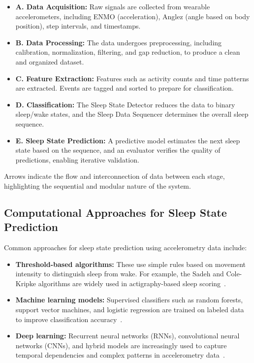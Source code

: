 \documentclass[conference]{IEEEtran}
\begin{document}
\begin{itemize}
    \item \textbf{A. Data Acquisition:} Raw signals are collected from wearable accelerometers, including ENMO (acceleration), Anglez (angle based on body position), step intervals, and timestamps.
    \item \textbf{B. Data Processing:} The data undergoes preprocessing, including calibration, normalization, filtering, and gap reduction, to produce a clean and organized dataset.
    \item \textbf{C. Feature Extraction:} Features such as activity counts and time patterns are extracted. Events are tagged and sorted to prepare for classification.
    \item \textbf{D. Classification:} The Sleep State Detector reduces the data to binary sleep/wake states, and the Sleep Data Sequencer determines the overall sleep sequence.
    \item \textbf{E. Sleep State Prediction:} A predictive model estimates the next sleep state based on the sequence, and an evaluator verifies the quality of predictions, enabling iterative validation.
\end{itemize}

Arrows indicate the flow and interconnection of data between each stage, highlighting the sequential and modular nature of the system.

\subsection{Computational Approaches for Sleep State Prediction}
Common approaches for sleep state prediction using accelerometry data include:
\begin{itemize}
    \item \textbf{Threshold-based algorithms:} These use simple rules based on movement intensity to distinguish sleep from wake. For example, the Sadeh and Cole-Kripke algorithms are widely used in actigraphy-based sleep scoring~\cite{van2011review, sadeh2011}.
    \item \textbf{Machine learning models:} Supervised classifiers such as random forests, support vector machines, and logistic regression are trained on labeled data to improve classification accuracy~\cite{van2011review, zhang2020machine, vanHees2015}.
    \item \textbf{Deep learning:} Recurrent neural networks (RNNs), convolutional neural networks (CNNs), and hybrid models are increasingly used to capture temporal dependencies and complex patterns in accelerometry data~\cite{zhang2020machine, behar2013}.
\end{itemize}
\end{document}
